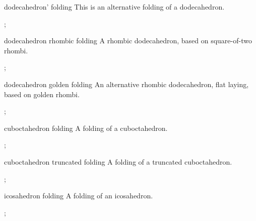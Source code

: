 \begin{pictype}{dodecahedron' folding}{}
    This is an alternative folding of a dodecahedron.
\begin{codeexample}[preamble={\usetikzlibrary{folding}}]
\tikz {};
\end{codeexample}
\end{pictype}

\begin{pictype}{dodecahedron rhombic folding}{}
    A rhombic dodecahedron, based on square-of-two rhombi.
\begin{codeexample}[preamble={\usetikzlibrary{folding}}]
\tikz {};
\end{codeexample}
\end{pictype}

\begin{pictype}{dodecahedron golden folding}{}
    An alternative rhombic dodecahedron, flat laying, based on golden rhombi.
\begin{codeexample}[preamble={\usetikzlibrary{folding}}]
\tikz {};
\end{codeexample}
\end{pictype}

\begin{pictype}{cuboctahedron folding}{}
    A folding of a cuboctahedron.
\begin{codeexample}[preamble={\usetikzlibrary{folding}}]
\tikz {};
\end{codeexample}
\end{pictype}

\begin{pictype}{cuboctahedron truncated folding}{}
    A folding of a truncated cuboctahedron.
\begin{codeexample}[preamble={\usetikzlibrary{folding}}]
\tikz {};
\end{codeexample}
\end{pictype}

\begin{pictype}{icosahedron folding}{}
    A folding of an icosahedron.
\begin{codeexample}[preamble={\usetikzlibrary{folding}}]
\tikz {};
\end{codeexample}
\end{pictype}

